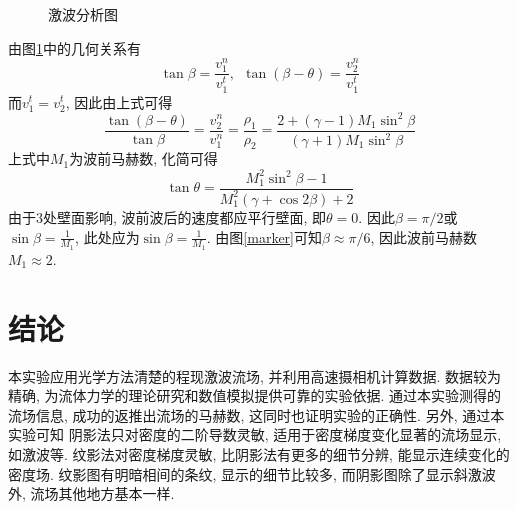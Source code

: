 \documentclass[12pt,a4paper,boxed,titlepage]{caspset}
\begin{document}
\begin{figure}[!htb]
\centering
{}
\caption{\label{analysis}激波分析图}
\end{figure}
由图\ref{analysis}中的几何关系有
\[
\tan\beta = \frac{v_1^n}{v_1^t}, {~~}\tan(\beta-\theta)=\frac{v_2^n}{v_1^t}
\]
而$v_1^t = v_2^t$, 因此由上式可得
\[
\frac{\tan(\beta-\theta)}{\tan\beta} = \frac{v_2^n}{v_1^n} = \frac{\rho_1}{\rho_2} = \frac{2+(\gamma-1)M_1\sin^2\beta}{(\gamma+1)M_1\sin^2\beta}
\]
上式中$M_1$为波前马赫数, 化简可得
\[
\tan\theta = \frac{M_1^2\sin^2\beta-1}{M_1^2(\gamma+\cos 2\beta)+2}
\]
由于3处壁面影响, 波前波后的速度都应平行壁面, 即$\theta = 0$. 因此$\beta=\pi/2$或$\sin\beta=\frac{1}{M_1}$, 此处应为$\sin\beta=\frac{1}{M_1}$. 由图\ref{marker}可知$\beta\approx\pi/6$, 因此波前马赫数$M_1\approx2$.

\section{结论}
本实验应用光学方法清楚的程现激波流场, 并利用高速摄相机计算数据. 数据较为精确, 为流体力学的理论研究和数值模拟提供可靠的实验依据. 通过本实验测得的流场信息, 成功的返推出流场的马赫数, 这同时也证明实验的正确性. 另外, 通过本实验可知 阴影法只对密度的二阶导数灵敏, 适用于密度梯度变化显著的流场显示, 如激波等. 纹影法对密度梯度灵敏, 比阴影法有更多的细节分辨, 能显示连续变化的密度场. 纹影图有明暗相间的条纹, 显示的细节比较多, 而阴影图除了显示斜激波外, 流场其他地方基本一样.
\end{document}
